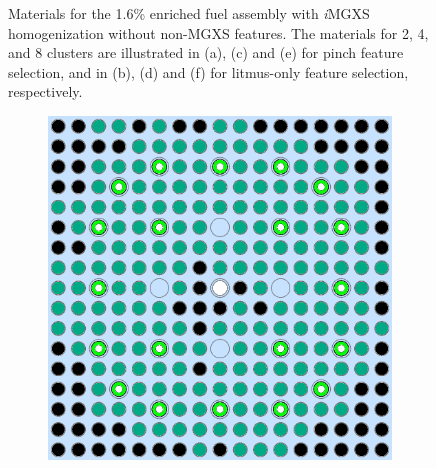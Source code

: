 \begin{appendices}
\begin{figure}[h!]
\begin{subfigure}{0.48\textwidth}
  \caption{}
  \label{fig:no-features-assm-16-combined-8}
\end{subfigure}
\caption[Clustered geometries without non-MGXS features]{Materials for the 1.6\% enriched fuel assembly with \textit{i}\ac{MGXS} homogenization without non-\ac{MGXS} features. The materials for 2, 4, and 8 clusters are illustrated in (a), (c) and (e) for pinch feature selection, and in (b), (d) and (f) for litmus-only feature selection, respectively.}
\label{fig:no-features-assm-16-geometries}
\end{figure}

\clearpage

\begin{figure}[h!]
\centering
\begin{subfigure}{0.48\textwidth}
  \centering
  \includegraphics[width=0.85\linewidth]{figures/unsupervised/geometries/without-features/2-clusters/pinch/assm-31-20BPs}
  \caption{}
  \label{fig:no-features-assm-31-20BPs-pinch-2}
\end{subfigure}%
\begin{subfigure}{0.48\textwidth}
  \centering

\end{subfigure}
\end{figure}
\end{appendices}
